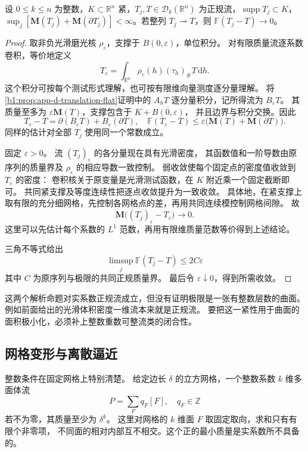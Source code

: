 \begin{proposition}\label{b1:prop:app-d-normal-weak-flat}
设 \(0\le k\le n\) 为整数，\(K\subset\mathbb R^n\) 紧，\(T_j,T\in\mathcal D_k(\mathbb R^n)\) 为正规流，\(\operatorname{supp}T_j\subset K\)，\(\sup_j[\mathbf M(T_j)+\mathbf M(\partial T_j)]<\infty\)。若整列 \(T_j\rightharpoonup T\)，则
\(\mathbb F(T_j-T)\rightarrow0\)。
\end{proposition}
\begin{proof}
取非负光滑磨光核 \(\rho_\varepsilon\)，支撑于 \(B(0,\varepsilon)\)，单位积分。
对有限质量流逐系数卷积，等价地定义
\[
 T_\varepsilon
    =\int_{\mathbb R^n}\rho_\varepsilon(h)(\tau_h)_\#T\,\mathrm{d}h.
\]
这个积分可按每个测试形式理解，也可按有限维向量测度逐分量理解。
将\cref{b1:prop:app-d-translation-flat}证明中的 \(A_hT\) 逐分量积分，记所得流为 \(B_\varepsilon T\)。
其质量至多为 \(\varepsilon\mathbf M(T)\)，支撑包含于 \(K+\overline{B(0,\varepsilon)}\)，
并且边界与积分交换。因此
\[
 T_\varepsilon-T
       =\partial(B_\varepsilon T)+B_\varepsilon(\partial T),\quad
 \mathbb F(T_\varepsilon-T)
       \leq\varepsilon\bigl(\mathbf M(T)+\mathbf M(\partial T)\bigr).
\]
同样的估计对全部 \(T_j\) 使用同一个常数成立。

固定 \(\varepsilon>0\)。
流 \((T_j)_\varepsilon\) 的各分量现在具有光滑密度，
其函数值和一阶导数由原序列的质量界及 \(\rho_\varepsilon\) 的相应导数一致控制。
弱收敛使每个固定点的密度值收敛到 \(T_\varepsilon\) 的密度：
卷积核关于原变量是光滑测试函数，在 \(K\) 附近乘一个固定截断即可。
共同紧支撑及等度连续性把逐点收敛提升为一致收敛。
具体地，在紧支撑上取有限的充分细网格，先控制各网格点的差，再用共同连续模控制网格间隙。
故
\[
 \mathbf M\bigl((T_j)_\varepsilon-T_\varepsilon\bigr)\longrightarrow0.
\]
这里可以先估计每个系数的 \(L^1\) 范数，再用有限维质量范数等价得到上述结论。

三角不等式给出
\[
 \limsup_j\mathbb F(T_j-T)\leq2C\varepsilon
\]
其中 \(C\) 为原序列与极限的共同正规质量界。
最后令 \(\varepsilon\downarrow0\)，得到所需收敛。
\end{proof}

这两个解析命题对实系数正规流成立，但没有证明极限是一张有整数层数的曲面。
例如前面给出的光滑体积密度一维流本来就是正规流。
要把这一紧性用于曲面的面积极小化，必须补上整数重数可整流类的闭合性。

\subsection{网格变形与离散逼近}
\label{b1:subsec:D10503}

整数条件在固定网格上特别清楚。
给定边长 \(\delta\) 的立方网格，一个整数系数 \(k\) 维多面体流
\[
 P=\sum_F q_F[F],\quad q_F\in\mathbb Z
\]
若不为零，其质量至少为 \(\delta^k\)。
这里对网格的 \(k\) 维面 \(F\) 取固定取向，求和只有有限个非零项，
不同面的相对内部互不相交。这个正的最小质量是实系数所不具备的。

